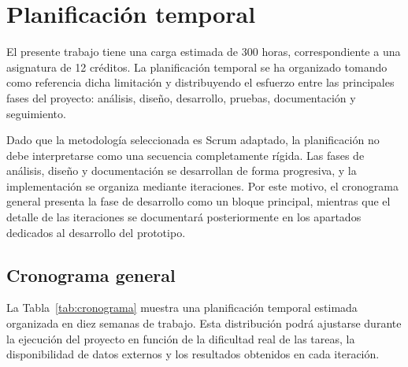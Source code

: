 \section{Planificación temporal}
\label{sec:planificacion}

El presente trabajo tiene una carga estimada de 300 horas, correspondiente a una asignatura de 12 créditos. La planificación temporal se ha organizado tomando como referencia dicha limitación y distribuyendo el esfuerzo entre las principales fases del proyecto: análisis, diseño, desarrollo, pruebas, documentación y seguimiento.

Dado que la metodología seleccionada es Scrum adaptado, la planificación no debe interpretarse como una secuencia completamente rígida. Las fases de análisis, diseño y documentación se desarrollan de forma progresiva, y la implementación se organiza mediante iteraciones. Por este motivo, el cronograma general presenta la fase de desarrollo como un bloque principal, mientras que el detalle de las iteraciones se documentará posteriormente en los apartados dedicados al desarrollo del prototipo.

\subsection{Cronograma general}

La Tabla~\ref{tab:cronograma} muestra una planificación temporal estimada organizada en diez semanas de trabajo. Esta distribución podrá ajustarse durante la ejecución del proyecto en función de la dificultad real de las tareas, la disponibilidad de datos externos y los resultados obtenidos en cada iteración.


